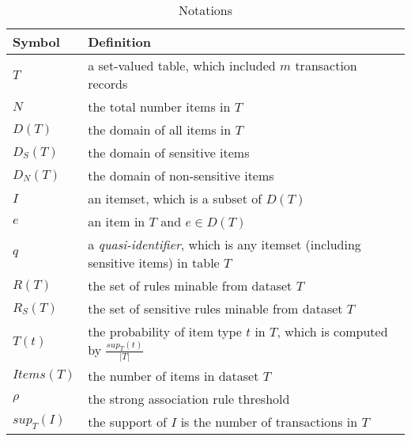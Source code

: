 \begin{table}[th]
\centering
\caption{Notations}
\label{table:notations}
\begin{tabular}{m{}|m{}}
  \hline
  \textbf{Symbol} & \textbf{Definition} \\  \hline
  $T$ %
	& a set-valued table, which included $m$ transaction records \\ \hline
  $N$ & the total number items in $T$ \\ \hline
  $D(T)$ & the domain of all items in $T$ \\ \hline
  $D_S(T)$ & the domain of sensitive items \\ \hline
  $D_N(T)$ & the domain of non-sensitive items \\ \hline
  $I$ & an itemset, which is a subset of $D(T)$\\ \hline
  $e$ & an item in $T$ and $e \in D(T)$ \\ \hline
  $q$ & a \emph{quasi-identifier}, which is any itemset
(including sensitive items) in table $T$ \\ \hline
  $R(T)$ & the set of rules minable from dataset $T$ \\ \hline
  $R_S(T)$ & the set of sensitive rules minable from dataset $T$ \\ \hline
  $T(t)$ & the probability of item type $t$ in $T$, which is computed by $\frac{sup_T(t)}{|T|}$  \\ \hline
  $Items(T)$ & the number of items in dataset $T$ \\ \hline
  $\rho$ & the strong association rule threshold \\ \hline
  $sup_{T}(I)$ & the support of $I$ is the number of transactions in $T$ 

\end{tabular}
\end{table}
